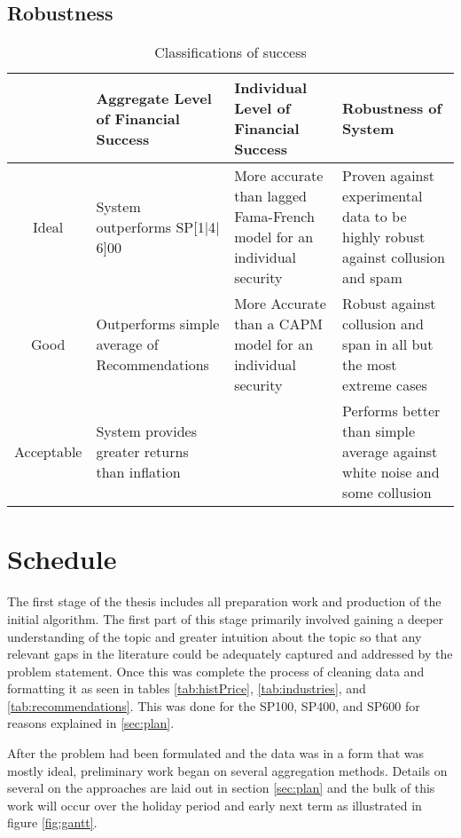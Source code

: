 \subsection{Robustness}

\begin{table}[p]
    \centering
    \begin{tabularx}{0.95\textwidth}{@{\extracolsep{\fill}}cXXX}
        \toprule\toprule
         & Aggregate Level of Financial Success  &Individual Level of Financial Success & Robustness of System \\\midrule
        Ideal & System outperforms SP[1$|$4$|$6]00 & More accurate than lagged Fama-French model for an individual security & Proven against experimental data to be highly robust against collusion and spam\\
        \addlinespace
        Good & Outperforms simple average of Recommendations & More Accurate than a CAPM model for an individual security & Robust against collusion and span in all but the most extreme cases\\
        \addlinespace
        Acceptable & System provides greater returns than inflation && Performs better than simple average against white noise and some collusion \\ \bottomrule
    \end{tabularx}
    \caption{Classifications of success}
    \label{tab:success}
\end{table}


\section{Schedule}
The first stage of the thesis includes all preparation work and production of the initial algorithm. The first part of this stage primarily involved gaining a deeper understanding of the topic and greater intuition about the topic so that any relevant gaps in the literature could be adequately captured and addressed by the problem statement. Once this was complete the process of cleaning data and formatting it as seen in tables \ref{tab:histPrice}, \ref{tab:industries}, and \ref{tab:recommendations}. This was done for the SP100, SP400, and SP600 for reasons explained in \ref{sec:plan}. 

After the problem had been formulated and the data was in a form that was mostly ideal, preliminary work began on several aggregation methods. Details on several on the approaches are laid out in section \ref{sec:plan} and the bulk of this work will occur over the holiday period and early next term as illustrated in figure \ref{fig:gantt}.

